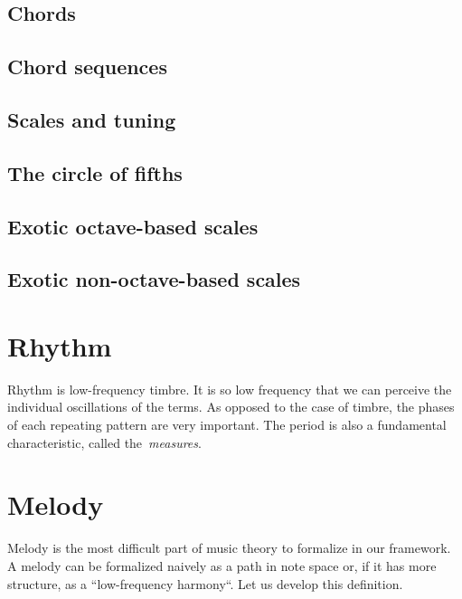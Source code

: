 \subsection{Chords}

\subsection{Chord sequences}

\subsection{Scales and tuning}

% 
\subsection{The circle of fifths}

\subsection{Exotic octave-based scales}

\subsection{Exotic non-octave-based scales}

\section{Rhythm}

Rhythm is low-frequency timbre.
It is so low frequency that we can perceive the individual oscillations of
the terms.  As opposed to the case of timbre, the phases of each repeating
pattern are very important.  The period is also a fundamental characteristic,
called the~\emph{measures}.


\section{Melody}

Melody is the most difficult part of music theory to formalize in our
framework.
A melody can be formalized naively as a path in note space or,
if it has more structure, as a ``low-frequency harmony``.  Let us develop
this definition.

